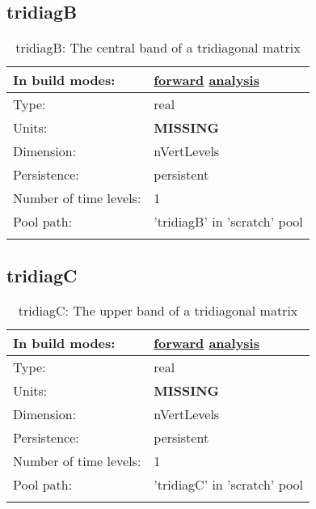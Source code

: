 \subsection[tridiagB]{tridiagB}
\label{subsec:var_sec_scratch_tridiagB}
\begin{center}
\begin{longtable}{| p{2.0in} | p{4.0in} |}
        \hline 
        In build modes: & \hyperref[subsec:forward_var_tab_scratch]{forward} \hyperref[subsec:analysis_var_tab_scratch]{analysis} \\
        \hline 
        Type: & real \\
        \hline 
        Units: & {\bf \color{red} MISSING} \\
        \hline 
        Dimension: & nVertLevels \\
        \hline 
        Persistence: & persistent \\
        \hline 
        Number of time levels: & 1 \\
        \hline 
            Pool path: & 'tridiagB' in 'scratch' pool
 \\
		 \hline 
    \caption{tridiagB: The central band of a tridiagonal matrix}
\end{longtable}
\end{center}
\subsection[tridiagC]{tridiagC}
\label{subsec:var_sec_scratch_tridiagC}
\begin{center}
\begin{longtable}{| p{2.0in} | p{4.0in} |}
        \hline 
        In build modes: & \hyperref[subsec:forward_var_tab_scratch]{forward} \hyperref[subsec:analysis_var_tab_scratch]{analysis} \\
        \hline 
        Type: & real \\
        \hline 
        Units: & {\bf \color{red} MISSING} \\
        \hline 
        Dimension: & nVertLevels \\
        \hline 
        Persistence: & persistent \\
        \hline 
        Number of time levels: & 1 \\
        \hline 
            Pool path: & 'tridiagC' in 'scratch' pool
 \\
		 \hline 
    \caption{tridiagC: The upper band of a tridiagonal matrix}
\end{longtable}
\end{center}
